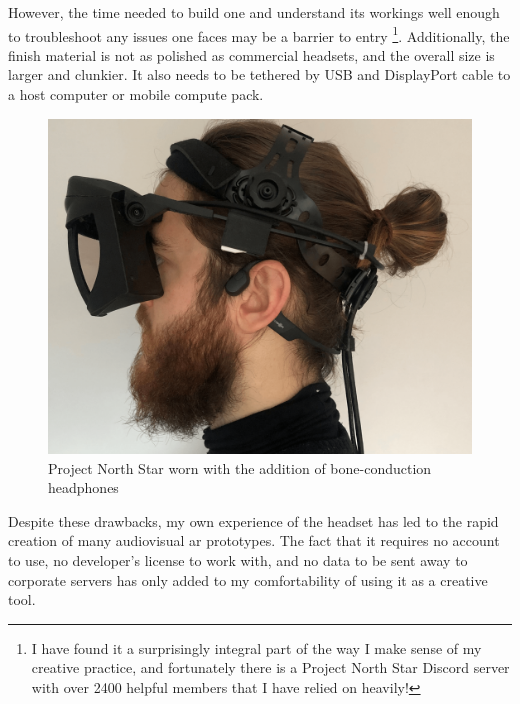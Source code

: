 However, the time needed to build one and understand its workings well enough to trouble\-shoot any issues one faces may be a barrier to entry \footnote{I have found it a surprisingly integral part of the way I make sense of my creative practice, and fortunately there is a Project North Star Discord server with over 2400 helpful members that I have relied on heavily!}. Additionally, the finish material is not as polished as commercial headsets, and the overall size is larger and clunkier. It also needs to be tethered by USB and DisplayPort cable to a host computer or mobile compute pack.

\begin{figure}
    \vspace{-\intextsep}
    \hfill
    \begin{minipage}{0.95\linewidth}
            \includegraphics[width=\linewidth]{figures/06-polaris/polaris-framework-hardware-bc.png}
            \captionsetup{justification=justified}
            \caption{Project North Star worn with the addition of bone-conduction headphones}\label{fig: polaris-framework-hardware-bc}
    \end{minipage}
\end{figure}
Despite these drawbacks, my own experience of the headset has led to the rapid creation of many audiovisual \ac{ar} prototypes. The fact that it requires no account to use, no developer's license to work with, and no data to be sent away to corporate servers has only added to my comfortability of using it as a creative tool.

